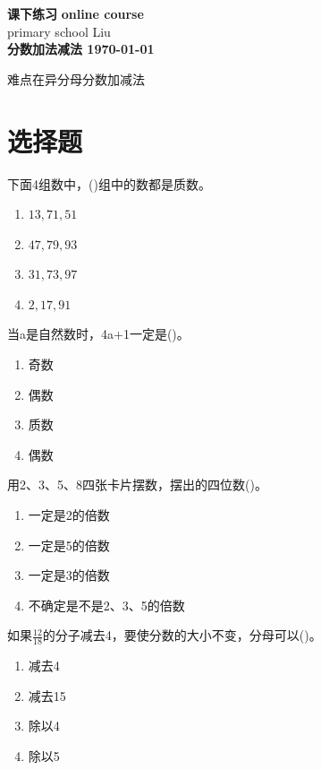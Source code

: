 \documentclass[DIN, pagenumber=false, fontsize=11pt, parskip=half]{scrartcl}
\newcommand{\mytitle}[1]{{\noindent\Large\textbf{#1}}}
\begin{document}
\noindent\textbf{课下练习} \hfill \textbf{online course}\\
primary school \hfill Liu\\

\mytitle{分数加法减法 \hfill \today}
\newline
\begin{parchmentquote}
	难点在异分母分数加减法
\end{parchmentquote}


\section{选择题}
下面4组数中，()组中的数都是质数。
\begin{enumerate}[label=\Alph*.]
  \item $13,71,51$
  \item $47,79,93$
  \item $31,73,97$
  \item $2,17,91$
\end{enumerate}
当a是自然数时，4a+1一定是()。

\begin{enumerate}[label=\Alph*.]
  \item 奇数 \item 偶数
  \item 质数
  \item 偶数
\end{enumerate}
用2、3、5、8四张卡片摆数，摆出的四位数()。

\begin{enumerate}[label=\Alph*.]
  \item 一定是2的倍数
  \item 一定是5的倍数
  \item 一定是3的倍数
  \item 不确定是不是2、3、5的倍数
\end{enumerate}
如果$\frac{12}{18}$的分子减去4，要使分数的大小不变，分母可以()。

\begin{enumerate}[label=\Alph*.]
  \item 减去4
  \item 减去15
  \item 除以4
  \item 除以5
\end{enumerate}
\end{document}
